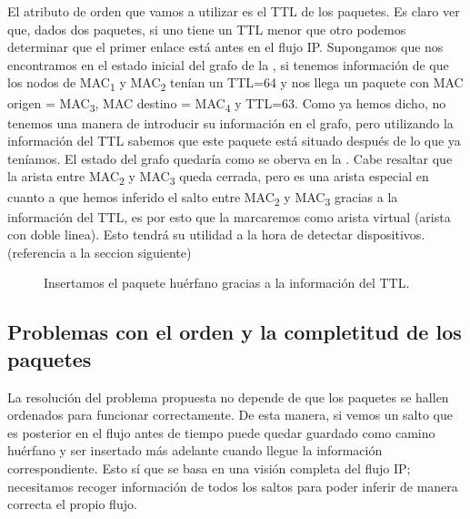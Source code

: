 \documentclass[twoside, 12pt]{epstfg}
\begin{document}
El atributo de orden que vamos a utilizar es el TTL de los paquetes. Es claro ver que, dados dos paquetes, si uno tiene un TTL menor que otro podemos determinar que el primer enlace está antes en el flujo IP. Supongamos que nos encontramos en el estado inicial del grafo de la , si tenemos información de que los nodos de MAC\textsubscript{1} y MAC\textsubscript{2} tenían un TTL=64 y nos llega un paquete con MAC origen = MAC\textsubscript{3}, MAC destino = MAC\textsubscript{4} y TTL=63. Como ya hemos dicho, no tenemos una manera de introducir su información en el grafo, pero utilizando la información del TTL sabemos que este paquete está situado después de lo que ya teníamos. El estado del grafo quedaría como se oberva en la . Cabe resaltar que la  arista entre MAC\textsubscript{2} y MAC\textsubscript{3} queda cerrada, pero es una arista especial en cuanto a que hemos inferido el salto entre MAC\textsubscript{2} y MAC\textsubscript{3} gracias a la información del TTL, es por esto que la marcaremos como arista virtual (arista con doble linea). Esto tendrá su utilidad a la hora de detectar dispositivos. (referencia a la seccion siguiente)

\begin{figure}
\centering

\caption[Ejemplo de resolución de camino huérfano]{Insertamos el paquete huérfano gracias a la información del TTL.}
\label{fig:Analisis:OrphanPath}
\end{figure}

\subsection{Problemas con el orden y la completitud de los paquetes} %
La resolución del problema propuesta no depende de que los paquetes se hallen ordenados para funcionar correctamente. De esta manera, si vemos un salto que es posterior en el flujo antes de tiempo puede quedar guardado como camino huérfano y ser insertado más adelante cuando llegue la información correspondiente. Esto sí que se basa en una visión completa del flujo IP; necesitamos recoger información de todos los saltos para poder inferir de manera correcta el propio flujo.
\end{document}

